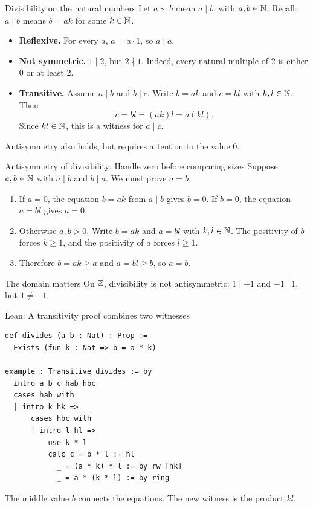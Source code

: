 \begin{frame}{Divisibility on the natural numbers}
Let $a\sim b$ mean $a\mid b$, with $a,b\in\mathbb{N}$.
Recall: $a\mid b$ means $b=ak$ for some $k\in\mathbb{N}$.
\begin{itemize}
\item \textbf{Reflexive.} For every $a$, $a=a\cdot1$, so $a\mid a$.
\item \textbf{Not symmetric.} $1\mid2$, but $2\nmid1$.
Indeed, every natural multiple of $2$ is either $0$ or at least $2$.
\item \textbf{Transitive.} Assume $a\mid b$ and $b\mid c$.
Write $b=ak$ and $c=bl$ with $k,l\in\mathbb{N}$. Then
\[
 c=bl=(ak)l=a(kl).
\]
Since $kl\in\mathbb{N}$, this is a witness for $a\mid c$.
\end{itemize}
Antisymmetry also holds, but requires attention to the value $0$.
\end{frame}

\begin{frame}{Antisymmetry of divisibility: Handle zero before comparing sizes}
Suppose $a,b\in\mathbb{N}$ with $a\mid b$ and $b\mid a$.
We must prove $a=b$.
\begin{enumerate}
\item If $a=0$, the equation $b=ak$ from $a\mid b$ gives $b=0$.
If $b=0$, the equation $a=bl$ gives $a=0$.
\item Otherwise $a,b>0$. Write $b=ak$ and $a=bl$ with $k,l\in\mathbb{N}$.
The positivity of $b$ forces $k\ge1$, and the positivity of $a$ forces $l\ge1$.
\item Therefore $b=ak\ge a$ and $a=bl\ge b$, so $a=b$.
\end{enumerate}
\begin{block}{The domain matters}
On $\mathbb{Z}$, divisibility is not antisymmetric: $1\mid-1$ and $-1\mid1$, but $1\ne-1$.
\end{block}
\end{frame}

\begin{frame}[fragile]{Lean: A transitivity proof combines two witnesses}
\begin{lstlisting}
def divides (a b : Nat) : Prop :=
  Exists (fun k : Nat => b = a * k)

example : Transitive divides := by
  intro a b c hab hbc
  cases hab with
  | intro k hk =>
      cases hbc with
      | intro l hl =>
          use k * l
          calc c = b * l := hl
            _ = (a * k) * l := by rw [hk]
            _ = a * (k * l) := by ring
\end{lstlisting}
The middle value $b$ connects the equations. The new witness is the product $kl$.
\end{frame}


